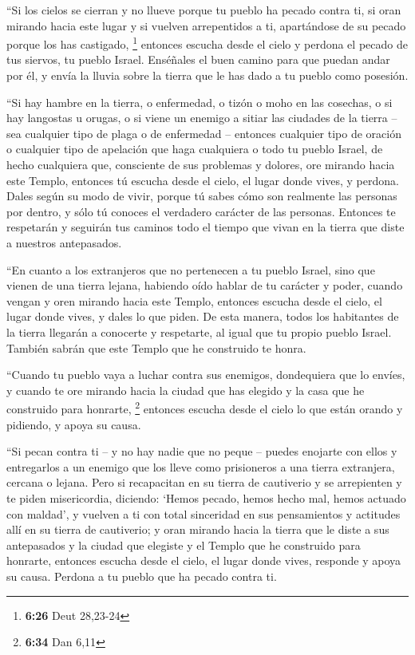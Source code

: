  ``Si los cielos se cierran y no llueve porque tu pueblo
ha pecado contra ti, si oran mirando hacia este lugar y si vuelven
arrepentidos a ti, apartándose de su pecado porque los has castigado,
\footnote{\textbf{6:26} Deut 28,23-24}  entonces escucha
desde el cielo y perdona el pecado de tus siervos, tu pueblo Israel.
Enséñales el buen camino para que puedan andar por él, y envía la lluvia
sobre la tierra que le has dado a tu pueblo como posesión.

 ``Si hay hambre en la tierra, o enfermedad, o tizón o
moho en las cosechas, o si hay langostas u orugas, o si viene un enemigo
a sitiar las ciudades de la tierra -- sea cualquier tipo de plaga o de
enfermedad --  entonces cualquier tipo de oración o
cualquier tipo de apelación que haga cualquiera o todo tu pueblo Israel,
de hecho cualquiera que, consciente de sus problemas y dolores, ore
mirando hacia este Templo,  entonces tú escucha desde el
cielo, el lugar donde vives, y perdona. Dales según su modo de vivir,
porque tú sabes cómo son realmente las personas por dentro, y sólo tú
conoces el verdadero carácter de las personas.  Entonces
te respetarán y seguirán tus caminos todo el tiempo que vivan en la
tierra que diste a nuestros antepasados.

 ``En cuanto a los extranjeros que no pertenecen a tu
pueblo Israel, sino que vienen de una tierra lejana, habiendo oído
hablar de tu carácter y poder, cuando vengan y oren mirando hacia este
Templo,  entonces escucha desde el cielo, el lugar donde
vives, y dales lo que piden. De esta manera, todos los habitantes de la
tierra llegarán a conocerte y respetarte, al igual que tu propio pueblo
Israel. También sabrán que este Templo que he construido te honra.

 ``Cuando tu pueblo vaya a luchar contra sus enemigos,
dondequiera que lo envíes, y cuando te ore mirando hacia la ciudad que
has elegido y la casa que he construido para honrarte, \footnote{\textbf{6:34}
  Dan 6,11}  entonces escucha desde el cielo lo que están
orando y pidiendo, y apoya su causa.

 ``Si pecan contra ti -- y no hay nadie que no peque --
puedes enojarte con ellos y entregarlos a un enemigo que los lleve como
prisioneros a una tierra extranjera, cercana o lejana. 
Pero si recapacitan en su tierra de cautiverio y se arrepienten y te
piden misericordia, diciendo: `Hemos pecado, hemos hecho mal, hemos
actuado con maldad',  y vuelven a ti con total sinceridad
en sus pensamientos y actitudes allí en su tierra de cautiverio; y oran
mirando hacia la tierra que le diste a sus antepasados y la ciudad que
elegiste y el Templo que he construido para honrarte, 
entonces escucha desde el cielo, el lugar donde vives, responde y apoya
su causa. Perdona a tu pueblo que ha pecado contra ti.

